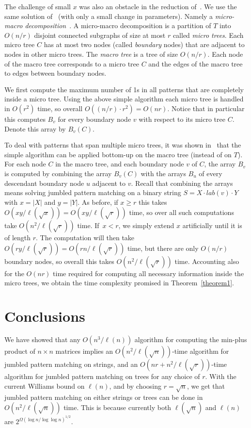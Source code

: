 \documentclass[11pt]{llncs}
\begin{document}
The challenge of small $x$ was also an obstacle in the reduction of~\cite{OurESA13}.
We use the same solution of~\cite{OurESA13} (with only a small change in parameters). Namely a \emph{micro-macro decomposition}~\cite{MicroMacro}.
A micro-macro decomposition is a partition of $T$ into
$O(n/r)$ disjoint connected subgraphs of size at most $r$ called {\em micro trees}. Each micro tree $C$ has at most two nodes (called \emph{boundary} nodes) that are adjacent to nodes in other micro trees. The {\em macro tree}  is a tree of size $O(n/r)$. Each node of the macro tree corresponds to a micro tree $C$ and the edges of the macro tree  to edges between boundary nodes.



We first compute the maximum number of 1s in all patterns that are completely inside a micro tree. Using the above simple algorithm each micro tree is handled in $O(r^2)$ time, so overall $O((n/r)\cdot  r^2)=O(nr)$. Notice that in particular this computes $B_v$ for every boundary node $v$ with respect to its micro tree $C$. Denote this array by $B_v(C)$.

To deal with patterns that span multiple micro trees, it was shown in~\cite{OurESA13} that the simple algorithm can be applied bottom-up on the macro tree (instead of on $T$). For each node $C$ in the macro tree, and each boundary node $v$ of $C$, the array $B_v$ is computed by combining the array $B_v(C)$ with the arrays $B_u$ of every descendant boundary node $u$ adjacent to $v$. Recall that combining the arrays means solving jumbled pattern matching on a binary string $S = X\cdot lab(v) \cdot Y$ with $x=|X|$ and $y=|Y|$. As before, if $x\ge r$ this takes $O(xy/\ell(\sqrt{x}))=O(xy/\ell(\sqrt{r}))$ time, so over all such computations take $O(n^2/\ell(\sqrt{r}))$ time. If~$x < r$, we simply extend $x$ artificially until it is of length $r$. The computation will then take $O(ry/\ell(\sqrt{r}))=O(rn/\ell(\sqrt{r}))$ time, but there are only $O(n/r)$ boundary nodes, so overall this takes $O(n^2/\ell(\sqrt{r}))$ time. Accounting also for the $O(nr)$ time required for computing all necessary information inside the micro trees, we obtain the time complexity promised in Theorem~\ref{theorem1}.



\section{Conclusions}
We have showed that any $O(n^3/\ell(n))$ algorithm for computing the min-plus product of $n\times n$ matrices implies an $O(n^2/\ell(\sqrt{n}))$-time algorithm for  jumbled pattern matching on strings, and an $O(nr+ n^2/\ell(\sqrt{r}))$-time algorithm for jumbled pattern matching on trees for any choice of $r$. With the current Williams bound on $\ell(n)$, and by choosing $r=\sqrt{n}$, we get that jumbled pattern matching on either strings or trees can be done in $O(n^2/\ell(\sqrt{n}))$ time. This is because currently both $\ell(\sqrt{n})$ and $\ell(n)$ are $2^{\Omega(\log n/\log \log n)^{1/2}}$.
\end{document}
